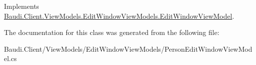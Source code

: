 Implements \hyperlink{class_baudi_1_1_client_1_1_view_models_1_1_edit_window_view_models_1_1_edit_window_view_model_aeae328bfe7608e01ce3c54da0c13f781}{Baudi.\+Client.\+View\+Models.\+Edit\+Window\+View\+Models.\+Edit\+Window\+View\+Model}.



The documentation for this class was generated from the following file\+:\begin{DoxyCompactItemize}
\item 
Baudi.\+Client/\+View\+Models/\+Edit\+Window\+View\+Models/Person\+Edit\+Window\+View\+Model.\+cs\end{DoxyCompactItemize}
